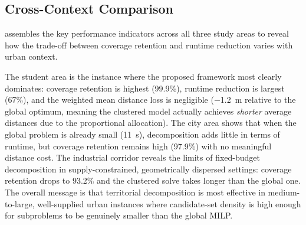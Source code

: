 \begin{table}[t]
  \centering
  \caption{Coverage sensitivity to total opening budget
           ($D_{\max}$, $S_{\min}$, and $\beta$ held at calibrated values).}
  \label{tab:budget}
  
\end{table}

\subsection{Cross-Context Comparison}
\label{ssec:crosscase}

 assembles the key performance indicators across
all three study areas to reveal how the trade-off between coverage
retention and runtime reduction varies with urban context.

\begin{table}[t]
  \centering
  \caption{Cross-context performance summary.
           Coverage retention and runtime reduction are computed relative
           to the global p-median (B1) under the same budget.}
  \label{tab:crosscase}
  
\end{table}

The student area is the instance where the proposed framework most clearly
dominates: coverage retention is highest (99.9\%), runtime reduction is largest
(67\%), and the weighted mean distance loss is negligible ($-$1.2~m relative to
the global optimum, meaning the clustered model actually achieves
\emph{shorter} average distances due to the proportional allocation).
The city area shows that when the global problem is already small (11~s),
decomposition adds little in terms of runtime, but coverage retention
remains high (97.9\%) with no meaningful distance cost.
The industrial corridor reveals the limits of fixed-budget decomposition
in supply-constrained, geometrically dispersed settings:
coverage retention drops to 93.2\% and the clustered solve takes longer
than the global one.
The overall message is that territorial decomposition is most effective
in medium-to-large, well-supplied urban instances where candidate-set
density is high enough for subproblems to be genuinely smaller than the
global MILP.
